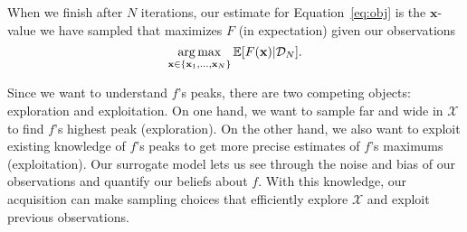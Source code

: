 When we finish after $N$ iterations, our estimate for Equation~\ref{eq:obj} is
the $\mathbf{x}$-value we have sampled that maximizes $F$ (in expectation) given our observations
\begin{equation*}
    \operatorname*{arg\,max}_{\mathbf{x} \in \{ \mathbf{x}_1, \dots, \mathbf{x}_N \} } \mathbb{E}[F(\mathbf{x}) | \mathcal{D}_N].
\end{equation*}

Since we want to understand $f$'s peaks,
there are two competing objects: exploration and exploitation.
On one hand, we want to sample far and wide in $\mathcal{X}$ to find $f$'s highest peak (exploration).
On the other hand, we also want to exploit existing knowledge of $f$'s peaks to get more precise estimates of $f$'s maximums (exploitation).
Our surrogate model lets us see through the noise and bias of our observations and quantify our beliefs about $f$.
With this knowledge, our acquisition can make sampling choices that efficiently explore $\mathcal{X}$ and exploit previous observations.

